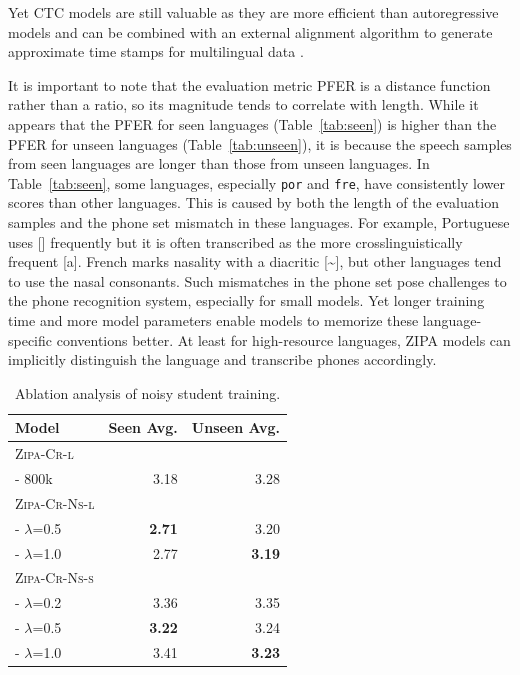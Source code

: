 \documentclass[11pt]{article}
\begin{document}
Yet CTC models are still valuable as they are more efficient than autoregressive models and can be combined with an external alignment algorithm to generate approximate time stamps for multilingual data \cite{kurzinger2020ctc, pratap2024scaling}.

It is important to note that the evaluation metric PFER is a distance function rather than a ratio, so its magnitude tends to correlate with length. While it appears that the PFER for seen languages (Table~\ref{tab:seen}) is higher than the PFER for unseen languages (Table~\ref{tab:unseen}), it is because the speech samples from seen languages are longer than those from unseen languages. In Table~\ref{tab:seen}, some languages, especially \texttt{por} and \texttt{fre}, have consistently lower scores than other languages. This is caused by both the length of the evaluation samples and the phone set mismatch in these languages. For example, Portuguese uses [] frequently but it is often transcribed as the more crosslinguistically frequent [a]. French marks nasality with a diacritic [\textasciitilde], but other languages tend to use the nasal consonants. Such mismatches in the phone set pose challenges to the phone recognition system, especially for small models. Yet longer training time and more model parameters enable models to memorize these language-specific conventions better. At least for high-resource languages, ZIPA models can implicitly distinguish the language and transcribe phones accordingly. 


\begin{table}[]
\centering
\small
\begin{tabular}{lrr}
\toprule
Model & Seen Avg. & Unseen Avg. \\\midrule
\textsc{Zipa-Cr-l} \\
\hspace{0.2in} - 800k &   3.18        &    3.28         \\
\textsc{Zipa-Cr-Ns-l}     &           &    \\
\hspace{0.2in} - $\lambda$=0.5 & \textbf{2.71} & 3.20 \\
\hspace{0.2in} - $\lambda$=1.0 & 2.77 & \textbf{3.19} \\\midrule
\textsc{Zipa-Cr-Ns-s}     &           &            \\
\hspace{0.2in} - $\lambda$=0.2 &  3.36 & 3.35\\
\hspace{0.2in} - $\lambda$=0.5 & \textbf{3.22} & 3.24\\
\hspace{0.2in} - $\lambda$=1.0 & 3.41 & \textbf{3.23} \\\bottomrule
\end{tabular}
\caption{Ablation analysis of noisy student training.}
\label{tab: abation}
\end{table}
\end{document}
